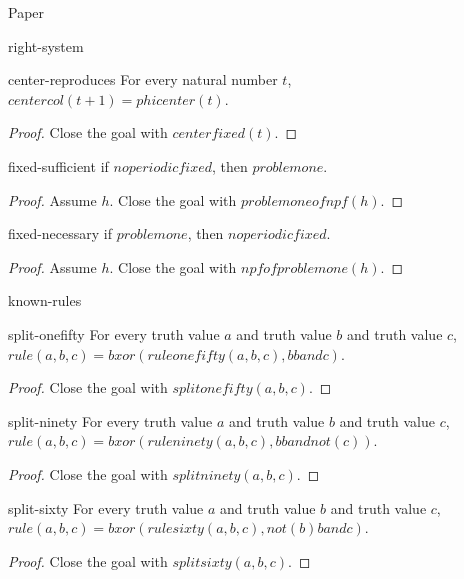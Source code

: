 \begin{lexlean}{Paper}
\begin{section}{right-system}
  \begin{theorem}{center-reproduces}
  For every natural number \(t\), \(centercol(t + 1) = phicenter(t)\).
  \begin{proof}
  Close the goal with \(centerfixed(t)\).
  \end{proof}
  \end{theorem}

  \begin{theorem}{fixed-sufficient}
  if \(noperiodicfixed\), then \(problemone\).
  \begin{proof}
  Assume \(h\).
  Close the goal with \(problemoneofnpf(h)\).
  \end{proof}
  \end{theorem}

  \begin{theorem}{fixed-necessary}
  if \(problemone\), then \(noperiodicfixed\).
  \begin{proof}
  Assume \(h\).
  Close the goal with \(npfofproblemone(h)\).
  \end{proof}
  \end{theorem}
\end{section}

\begin{section}{known-rules}
  \begin{theorem}{split-onefifty}
  For every truth value \(a\) and truth value \(b\) and truth value \(c\), \(rule(a, b, c) = bxor(ruleonefifty(a, b, c), b band c)\).
  \begin{proof}
  Close the goal with \(splitonefifty(a, b, c)\).
  \end{proof}
  \end{theorem}

  \begin{theorem}{split-ninety}
  For every truth value \(a\) and truth value \(b\) and truth value \(c\), \(rule(a, b, c) = bxor(ruleninety(a, b, c), b band not(c))\).
  \begin{proof}
  Close the goal with \(splitninety(a, b, c)\).
  \end{proof}
  \end{theorem}

  \begin{theorem}{split-sixty}
  For every truth value \(a\) and truth value \(b\) and truth value \(c\), \(rule(a, b, c) = bxor(rulesixty(a, b, c), not(b) band c)\).
  \begin{proof}
  Close the goal with \(splitsixty(a, b, c)\).
  \end{proof}
  \end{theorem}


\end{section}
\end{lexlean}

